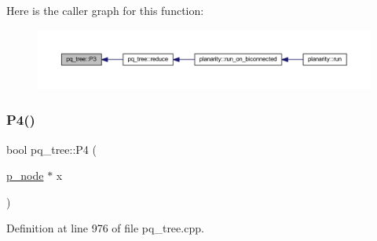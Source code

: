 Here is the caller graph for this function\+:\nopagebreak
\begin{figure}[H]
\begin{center}
\leavevmode
\includegraphics[width=350pt]{classpq__tree_a8afbdc0f1163021d5ca651c32a1da1d3_icgraph}
\end{center}
\end{figure}
\mbox{\label{classpq__tree_aacac6fd2b8e973b98f961e91285540f0}} 
\subsubsection{\texorpdfstring{P4()}{P4()}}
{\footnotesize\ttfamily bool pq\+\_\+tree\+::\+P4 (\begin{DoxyParamCaption}\item[{\mbox{\hyperlink{classp__node}{p\+\_\+node}} $\ast$}]{x }\end{DoxyParamCaption})\hspace{0.3cm}{\ttfamily [private]}}



Definition at line 976 of file pq\+\_\+tree.\+cpp.


